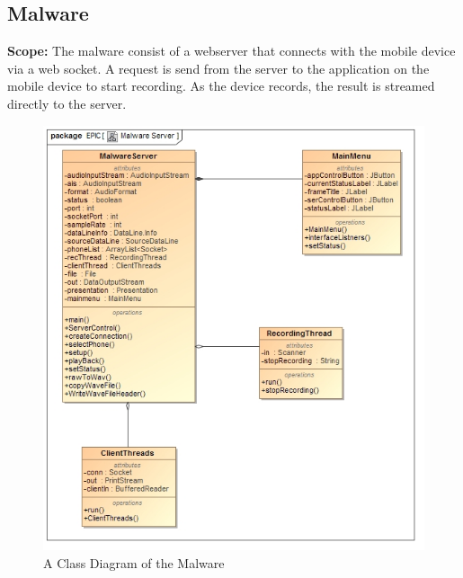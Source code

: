 \documentclass{article}
\begin{document}
		\subsection{Malware}
		\textbf{Scope: } The malware consist of a webserver that connects with the mobile device via a web socket. A request is send from the server to the application on the mobile device to start recording. As the device records, the result is streamed directly to the server.
		\begin{figure}[H]
 			 \centering
			  \includegraphics[width=12cm]{MalwareClass}
		 	 \caption{A Class Diagram of the Malware}
		\end{figure}
\end{document}

